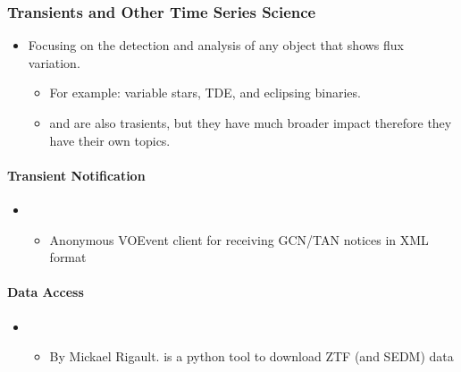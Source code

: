 \documentclass[letterpaper,10pt,english]{sphinxmanual}
\begin{document}
\subsubsection{Transients and Other Time Series Science}
\label{\detokenize{resource/astro/topics/transient_and_time_domain:transients-and-other-time-series-science}}\label{\detokenize{resource/astro/topics/transient_and_time_domain::doc}}\begin{itemize}
\item {} 
Focusing on the detection and analysis of any object that shows flux
variation.
\begin{itemize}
\item {} 
For example: variable stars, TDE, and eclipsing binaries.

\item {} 
 and  are also trasients, but they have
much broader impact therefore they have their own topics.

\end{itemize}

\end{itemize}


\paragraph{Transient Notification}
\label{\detokenize{resource/astro/topics/transient_and_time_domain:transient-notification}}\begin{itemize}
\item {} 
\begin{itemize}
\item {} 
Anonymous VOEvent client for receiving GCN/TAN notices in XML
format

\end{itemize}

\end{itemize}


\paragraph{Data Access}
\label{\detokenize{resource/astro/topics/transient_and_time_domain:data-access}}\begin{itemize}
\item {} 
\begin{itemize}
\item {} 
By Mickael Rigault.  is a python tool to download ZTF
(and SEDM) data

\end{itemize}

\end{itemize}
\end{document}
